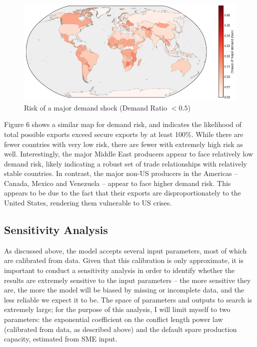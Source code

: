 \documentclass{article}
\begin{document}
\begin{figure}[h!]
	\centering
	\includegraphics[width=\textwidth]{../Graphics/DemandShockMap}
	\caption{Risk of a major demand shock (Demand Ratio $<0.5$)}

\end{figure}

Figure 6 shows a similar map for demand risk, and indicates the likelihood of total possible exports exceed secure exports by at least 100\%. While there are fewer countries with very low risk, there are fewer with extremely high risk as well. Interestingly, the major Middle East producers appear to face relatively low demand risk, likely indicating a robust set of trade relationships with relatively stable countries. In contrast, the major non-US producers in the Americas -- Canada, Mexico and Venezuela -- appear to face higher demand risk. This appears to be due to the fact that their exports are disproportionately to the United States, rendering them vulnerable to US crises.

\subsection{Sensitivity Analysis}

As discussed above, the model accepts several input parameters, most of which are calibrated from data. Given that this calibration is only approximate, it is important to conduct a sensitivity analysis in order to identify whether the results are extremely sensitive to the input parameters -- the more sensitive they are, the more the model will be biased by missing or incomplete data, and the less reliable we expect it to be. The space of parameters and outputs to search is extremely large; for the purpose of this analysis, I will limit myself to two parameters: the exponential coefficient on the conflict length power law (calibrated from data, as described above) and the default spare production capacity, estimated from SME input.
\end{document}
